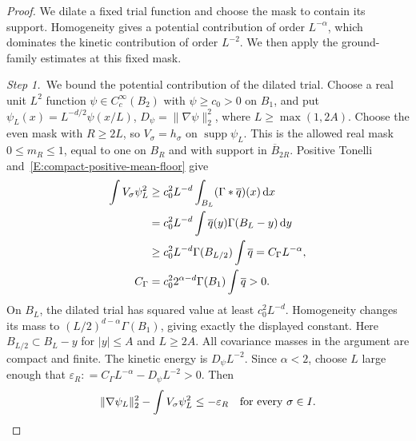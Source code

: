 \begin{proof}
  We dilate a fixed trial function and choose the mask to contain its support.
  Homogeneity gives a potential contribution of order $L^{-\alpha}$, which
  dominates the kinetic contribution of order $L^{-2}$. We then apply the
  ground-family estimates at this fixed mask.

  \medskip
  \noindent\textit{Step 1.~}We bound the potential contribution of the dilated
  trial.
  Choose a real unit $L^2$ function $\psi \in C_c^\infty(B_2)$ with $\psi \ge
  c_0 > 0$ on $B_1$, and put $\psi_L(x) = L^{-d/2}\psi(x/L)$, $D_\psi =
  \|\nabla\psi\|_2^2$, where $L \ge \max(1,2A)$. Choose the even mask with $R
  \ge 2L$, so $V_\sigma = h_\sigma$ on $\operatorname{supp}\psi_L$. This is the
  allowed real mask $0 \le m_R \le 1$, equal to one on $B_R$ and with support in
  $\overline{B}_{2R}$. Positive Tonelli
  and~\eqref{E:compact-positive-mean-floor} give
  \begin{align}
    \int V_\sigma\psi_L^2
    &\ge c_0^2L^{-d}\int_{B_L}(\Gamma*\overline{q})(x)\,\mathrm{d} x\nonumber\\
    &=c_0^2L^{-d}\int\overline{q}(y)\Gamma(B_L-y)\,\mathrm{d} y\nonumber\\
    &\ge c_0^2L^{-d}\Gamma(B_{L/2})\int\overline{q}
    =C_\Gamma L^{-\alpha},\label{E:compact-trial-potential}\\
    C_\Gamma&=c_0^22^{\alpha-d}\Gamma(B_1)\int\overline{q}>0.\nonumber
  \end{align}
  On $B_L$, the dilated trial has squared value at least $c_0^2L^{-d}$.
  Homogeneity changes its mass to $(L/2)^{d-\alpha}\Gamma(B_1)$, giving
  exactly the displayed constant.
  Here $B_{L/2} \subset B_L-y$ for $|y| \le A$ and $L \ge 2A$. All covariance
  masses in the argument are compact and finite. The kinetic energy is $D_\psi
  L^{-2}$. Since $\alpha < 2$, choose $L$ large enough that $\varepsilon_R: =
  C_\Gamma L^{-\alpha}-D_\psi L^{-2} > 0$. Then
  \[
    \|\nabla\psi_L\|_2^2-\int V_\sigma\psi_L^2
    \le-\varepsilon_R\quad\hbox{for every }\sigma\in I.
  \]


\end{proof}
